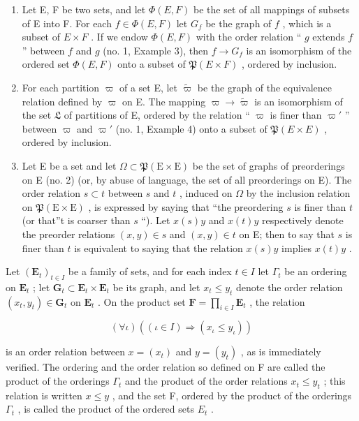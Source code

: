 \begin{enumerate}
\def\labelenumi{(\arabic{enumi})}
\item
  Let E, F be two sets, and let \(\Phi(E, F)\) be the set of all mappings of subsets of E into F. For each \(f \in \Phi(E, F)\) let \(G_f\) be the graph of \(f\) , which is a subset of \(E \times F\) . If we endow \(\Phi(E, F)\) with the order relation `` \(g\) extends \(f\) '' between \(f\) and \(g\) (no. 1, Example 3), then \(f \to G_f\) is an isomorphism of the ordered set \(\Phi(E, F)\) onto a subset of \(\mathfrak{P}(E \times F)\) , ordered by inclusion.
\item
  For each partition \(\varpi\) of a set E, let \(\tilde{\varpi}\) be the graph of the equivalence relation defined by \(\varpi\) on E. The mapping \(\varpi \to \tilde{\varpi}\) is an isomorphism of the set \(\mathfrak{L}\) of partitions of E, ordered by the relation `` \(\varpi\) is finer than \(\varpi'\) '' between \(\varpi\) and \(\varpi'\) (no. 1, Example 4) onto a subset of \(\mathfrak{P}(E \times E)\) , ordered by inclusion.
\item
  Let E be a set and let \(\Omega \subset \mathfrak{P}(\mathrm{E} \times \mathrm{E})\) be the set of graphs of preorderings on E (no. 2) (or, by abuse of language, the set of all preorderings on E). The order relation \(s \subset t\) between \(s\) and \(t\) , induced on \(\Omega\) by the inclusion relation on \(\mathfrak{P}(\mathrm{E} \times \mathrm{E})\) , is expressed by saying that ``the preordering \(s\) is finer than \(t\) (or that''t is coarser than \(s\) ``). Let \(x(s)y\) and \(x(t)y\) respectively denote the preorder relations \((x,y) \in s\) and \((x,y) \in t\) on E; then to say that \(s\) is finer than \(t\) is equivalent to saying that the relation \(x(s)y\) implies \(x(t)y\) .
\end{enumerate}

Let \((\mathbf{E}_t)_{t \in I}\) be a family of sets, and for each index \(t \in I\) let \(\Gamma_t\) be an ordering on \(\mathbf{E}_t\) ; let \(\mathbf{G}_t \subset \mathbf{E}_t \times \mathbf{E}_t\) be its graph, and let \(x_t \leqslant y_t\) denote the order relation \((x_t, y_t) \in \mathbf{G}_t\) on \(\mathbf{E}_t\) . On the product set \(\mathbf{F} = \prod_{i \in I} \mathbf{E}_t\) , the relation

\[
(\forall \iota) ((\iota \in I) \Longrightarrow (x _ {\iota} \leqslant y _ {\iota}))
\]

is an order relation between \(x = (x_{t})\) and \(y = (y_{t})\) , as is immediately verified. The ordering and the order relation so defined on F are called the product of the orderings \(\Gamma_{t}\) and the product of the order relations \(x_{t} \leqslant y_{t}\) ; this relation is written \(x \leqslant y\) , and the set F, ordered by the product of the orderings \(\Gamma_{t}\) , is called the product of the ordered sets \(E_{t}\) .

